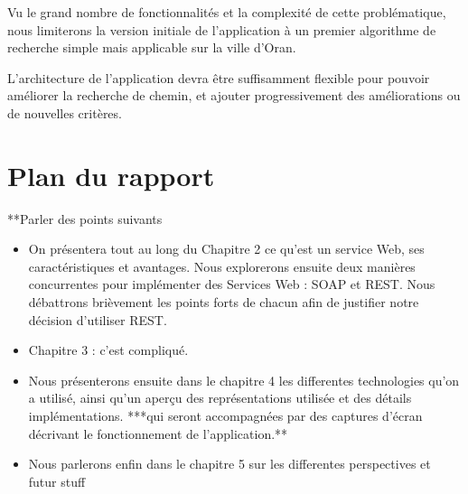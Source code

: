 Vu le grand nombre de fonctionnalités et la complexité de cette problématique, nous limiterons la version initiale de l'application à un premier algorithme de recherche simple mais applicable sur la ville d'Oran.

L'architecture de l'application devra être suffisamment flexible pour pouvoir améliorer la recherche de chemin, et ajouter progressivement des améliorations ou de nouvelles critères.
	 
		 
\newpage
\section{Plan du rapport}

**Parler des points suivants 
\begin{itemize}
\item On présentera tout au long du Chapitre 2 ce qu'est un service Web, ses caractéristiques et avantages. 
Nous explorerons ensuite deux manières concurrentes pour implémenter des Services Web : SOAP et REST. 
Nous débattrons brièvement les points forts de chacun afin de justifier notre décision d'utiliser REST.

\item Chapitre 3 : c'est compliqué.

\item Nous présenterons ensuite dans le chapitre 4 les differentes technologies qu'on a utilisé, ainsi qu'un aperçu des représentations utilisée et des détails implémentations. ***qui seront accompagnées par des captures d'écran décrivant le fonctionnement de l'application.**
\item Nous parlerons enfin dans le chapitre 5 sur les differentes perspectives et futur stuff
\end{itemize}